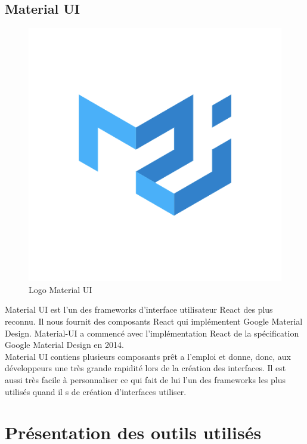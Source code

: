     \subsection{Material UI}
    \begin{figure}[H]
        \centering
        \includegraphics[scale=0.4]{ACR/materialui-logo.png}
        \caption{Logo Material UI}
    \end{figure}

    Material UI\cite{mui} est l'un des frameworks d'interface utilisateur React des plus reconnu. Il nous fournit des composants React qui implémentent Google Material Design. Material-UI a commencé avec l'implémentation React de la spécification Google Material Design en 2014.\\

    Material UI contiens plusieurs composants prêt a l'emploi et donne, donc, aux développeurs une très grande rapidité lors de la création des interfaces. Il est aussi très facile à personnaliser ce qui fait de lui l'un des frameworks les plus utilisés quand il s de création d'interfaces utiliser.\\

\section{Présentation des outils utilisés}
